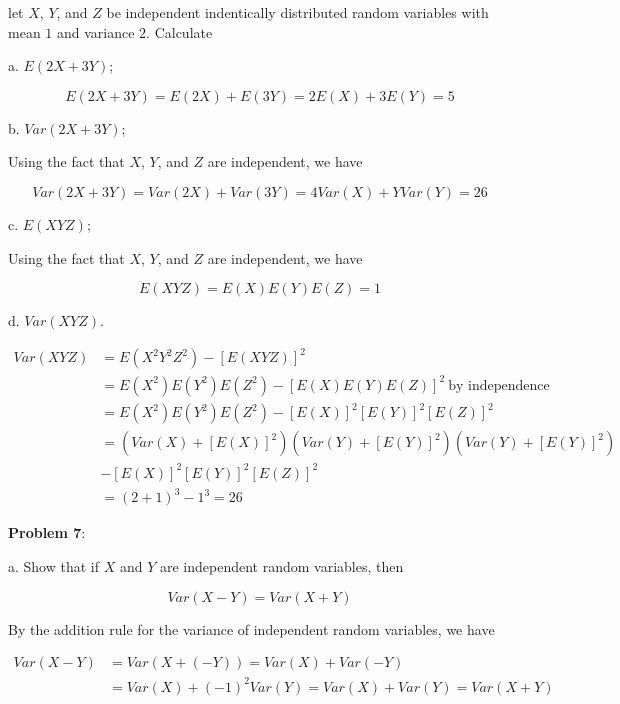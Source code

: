 \documentclass{article}
\begin{document}
let $X$, $Y$, and $Z$ be independent indentically distributed random variables with mean $1$ and variance $2$. Calculate

\indent\indent a. $E(2X+3Y)$;

{\color{blue}

$$E(2X+3Y)=E(2X)+E(3Y)=2E(X)+3E(Y)=5$$

}

\indent\indent b. $Var(2X+3Y)$;

{\color{blue}

Using the fact that $X$, $Y$, and $Z$ are independent, we have

$$Var(2X+3Y)=Var(2X)+Var(3Y)=4Var(X)+YVar(Y)=26$$

}

\indent\indent c. $E(XYZ)$;

{\color{blue}

Using the fact that $X$, $Y$, and $Z$ are independent, we have

$$E(XYZ)=E(X)E(Y)E(Z)=1$$

}

\indent\indent d. $Var(XYZ)$.

{\color{blue}

\begin{align*}
    Var(XYZ)&=E(X^2Y^2Z^2)-[E(XYZ)]^2\\
    &=E(X^2)E(Y^2)E(Z^2)-[E(X)E(Y)E(Z)]^2\ \text{by independence}\\
    &=E(X^2)E(Y^2)E(Z^2)-[E(X)]^2[E(Y)]^2[E(Z)]^2\\
    &=(Var(X)+[E(X)]^2)(Var(Y)+[E(Y)]^2)(Var(Y)+[E(Y)]^2)\\
    &-[E(X)]^2[E(Y)]^2[E(Z)]^2\\
    &=(2+1)^3-1^3=26
\end{align*}

}

\noindent\textbf{Problem 7}:

\indent\indent a. Show that if $X$ and $Y$ are independent random variables, then

$$Var(X-Y)=Var(X+Y)$$

{\color{blue}

By the addition rule for the variance of independent random variables, we have

\begin{align*}
    Var(X-Y)&=Var(X+(-Y))=Var(X)+Var(-Y)\\
    &=Var(X)+(-1)^2Var(Y)=Var(X)+Var(Y)=Var(X+Y)
\end{align*}

}
\end{document}
